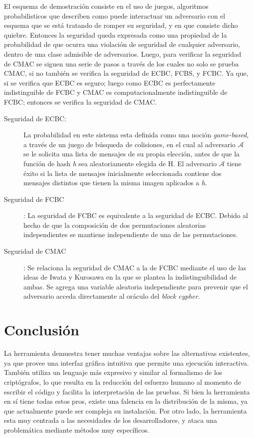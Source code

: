 \documentclass[runningheads]{llncs}
\begin{document}
El esquema de demostración consiste en el uso de juegos, algoritmos probabilisticos que describen como puede interactuar un adversario con el esquema que se está tratando de romper su seguridad, y en que consiste dicho quiebre. Entonces la seguridad queda expresada como una propiedad de la probabilidad de que ocurra una violación de seguridad de cualquier adversario, dentro de una clase admisible de adversarios. Luego, para verificar la seguridad de CMAC se siguen una serie de pasos a través de los cuales no solo se prueba CMAC, si no también se verifica la seguridad de ECBC, FCBS, y FCBC. Ya que, si se verifica que ECBC es seguro; luego como ECBC es perfectamente indistinguible de FCBC y CMAC es computacionalmente indistinguible de FCBC; entonces se verifica la seguridad de CMAC.

\begin{description}
\item[Seguridad de ECBC:] La probabilidad en este sistema esta definida como una noción \textit{game-based}, a través de un juego de búsqueda de colisiones, en el cual al adversario $\mathcal{A}$ se le solicita una lista de mensajes de su propia elección, antes de que la función de hash \textit{h} sea aleatoriamente elegida de H. El adversario $\mathcal{A}$ tiene éxito si la lista de mensajes inicialmente seleccionada contiene dos mensajes distintos que tienen la misma imagen aplicados a \textit{h}.

\item[Seguridad de FCBC]: La seguridad de FCBC es equivalente a la seguridad de ECBC. Debido al hecho de que la composición de dos permutaciones aleatorias independientes se mantiene independiente de una de las permutaciones.

\item[Seguridad de CMAC]: Se relaciona la seguridad de CMAC a la de FCBC mediante el uso de las ideas de Iwata y Kurosawa en la que se plantea la indistinguibilidad de ambas. Se agrega una variable aleatoria independiente para prevenir que el adversario acceda directamente al oráculo del \textit{block cypher}.
\end{description}

\section{Conclusión}

La herramienta demuestra tener muchas ventajas sobre las alternativas existentes, ya que provee una interfaz gráfica intuitiva que permite una ejecución interactiva. También utiliza un lenguaje más expresivo y similar al formalismo de los criptógrafos, lo que resulta en la reducción del esfuerzo humano al momento de escribir el código y facilita la interpretación de las pruebas. Si bien la herramienta en sí tiene todas estos pros, existe una falencia en la distribución de la misma, ya que actualmente puede ser compleja su instalación. Por otro lado, la herramienta esta muy centrada a las necesidades de los desarrolladores, y ataca una problemática mediante métodos muy específicos.
\end{document}
